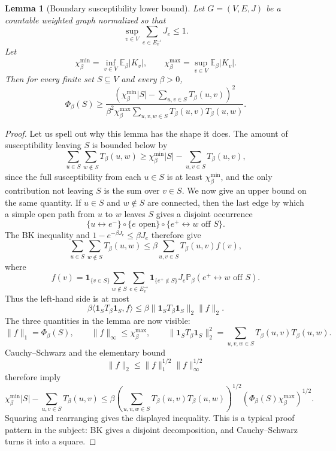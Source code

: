 \documentclass[11pt,reqno]{book}
\numberwithin{equation}{chapter}
\theoremstyle{plain}
\newtheorem{lemma}[theorem]{Lemma}
\theoremstyle{definition}
\theoremstyle{remark}
\newcommand{\Pb}{\mathbb P_\beta}
\newcommand{\E}{\mathbb E}
\newcommand{\1}{\mathbf 1}
\begin{document}
\begin{lemma}[Boundary susceptibility lower bound]
Let \(G=(V,E,J)\) be a countable weighted graph normalized so that
\[
  \sup_{v\in V}\sum_{e\in E_v^\rightarrow}J_e\leq 1.
\]
Let
\[
  \chi_\beta^{\min}=\inf_{v\in V}\E_\beta|K_v|,
  \qquad
  \chi_\beta^{\max}=\sup_{v\in V}\E_\beta|K_v|.
\]
Then for every finite set \(S\subseteq V\) and every \(\beta>0\),
\[
  \Phi_\beta(S)
  \geq
  \frac{
    \left(\chi_\beta^{\min}|S|-\sum_{u,v\in S}T_\beta(u,v)\right)^2
  }{
    \beta^2\chi_\beta^{\max}
    \sum_{u,v,w\in S}T_\beta(u,v)T_\beta(u,w)
  }.
\]
\end{lemma}

\begin{proof}
Let us spell out why this lemma has the shape it does. The amount of susceptibility leaving \(S\) is bounded below by
\[
  \sum_{u\in S}\sum_{w\notin S}T_\beta(u,w)
  \geq
  \chi_\beta^{\min}|S|
  -
  \sum_{u,v\in S}T_\beta(u,v),
\]
since the full susceptibility from each \(u\in S\) is at least
\(\chi_\beta^{\min}\), and the only contribution not leaving \(S\) is the
sum over \(v\in S\). We now give an upper bound on the same quantity. If
\(u\in S\) and \(w\notin S\) are connected, then the last edge by which a
simple open path from \(u\) to \(w\) leaves \(S\) gives a disjoint occurrence
\[
  \{u\leftrightarrow e^-\}
  \circ
  \{e\text{ open}\}
  \circ
  \{e^+\leftrightarrow w\text{ off }S\}.
\]
The BK inequality and \(1-e^{-\beta J_e}\leq \beta J_e\) therefore give
\[
  \sum_{u\in S}\sum_{w\notin S}T_\beta(u,w)
  \leq
  \beta
  \sum_{u,v\in S}T_\beta(u,v) f(v),
\]
where
\[
  f(v)=
  \1_{\{v\in S\}}
  \sum_{w\notin S}
  \sum_{e\in E_v^\rightarrow}
  \1_{\{e^+\notin S\}}J_e
  \Pb(e^+\leftrightarrow w\text{ off }S).
\]
Thus the left-hand side is at most
\[
  \beta\langle \1_S T_\beta\1_S,f\rangle
  \leq
  \beta\|\1_S T_\beta\1_S\|_2\|f\|_2.
\]
The three quantities in the lemma are now visible:
\[
  \|f\|_1=\Phi_\beta(S),\qquad
  \|f\|_\infty\leq \chi_\beta^{\max},
  \qquad
  \|\1_S T_\beta\1_S\|_2^2
  =
  \sum_{u,v,w\in S}T_\beta(u,v)T_\beta(u,w).
\]
Cauchy--Schwarz and the elementary bound
\[
  \|f\|_2\leq \|f\|_1^{1/2}\|f\|_\infty^{1/2}
\]
therefore imply
\[
  \chi_\beta^{\min}|S|
  -
  \sum_{u,v\in S}T_\beta(u,v)
  \leq
  \beta
  \left(\sum_{u,v,w\in S}T_\beta(u,v)T_\beta(u,w)\right)^{1/2}
  \left(\Phi_\beta(S)\chi_\beta^{\max}\right)^{1/2}.
\]
Squaring and rearranging gives the displayed inequality. This is a typical proof pattern in the subject: BK gives a disjoint decomposition, and Cauchy--Schwarz turns it into a square.
\end{proof}
\end{document}
